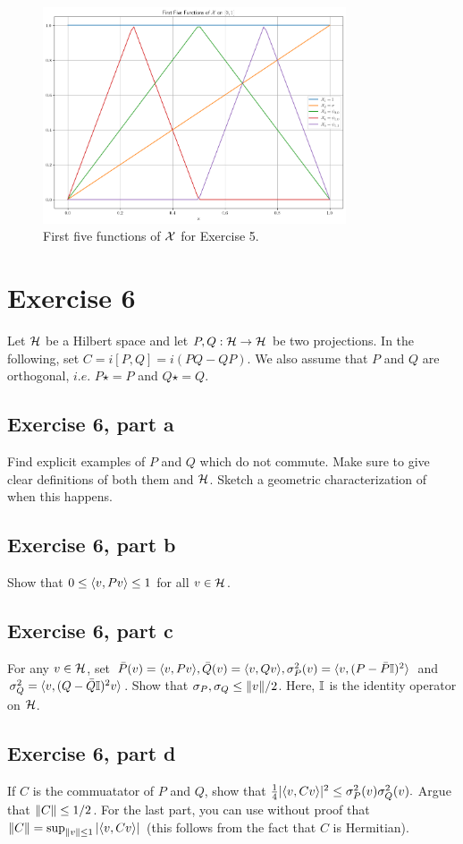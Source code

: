 \newpage
\vspace{5in}
\begin{figure}
    \centering
    \includegraphics[width = 0.8\textwidth]{Figures/Exercise5.png}
    \caption{First five functions of $\mathcal{X}$ for Exercise 5.}
    \label{fig:Exercise5}
\end{figure}
\clearpage

\newpage
\section{Exercise 6}
Let $\mathcal{H}$ be a Hilbert space and let $P, Q: \mathcal{H} \to \mathcal{H}$ be two projections. In the following, set $C = i[P, Q] = i(PQ - QP)$. We also assume that $P$ and $Q$ are orthogonal, $i.e.$ $P\star = P$ and $Q\star = Q$.
\subsection{Exercise 6, part a}
Find explicit examples of $P$ and $Q$ which do not commute. Make sure to give clear definitions of both them and $\mathcal{H}$. Sketch a geometric characterization of when this happens. 

\newpage
\subsection{Exercise 6, part b}
Show that $0 \leq \langle v, Pv \rangle \leq 1$ for all $v \in \mathcal{H}$. 

\newpage
\subsection{Exercise 6, part c}
For any $v \in \mathcal{H}$, set $\Bar{P}(v) = \langle v, Pv \rangle, \Bar{Q}(v) = \langle v, Qv \rangle, \sigma^2_P(v) = \langle v, (P - \Bar{P} \mathbb{I})^2 \rangle$ and $\sigma_Q^2 = \langle v, (Q - \Bar{Q} \mathbb{I})^2 v \rangle$. Show that $\sigma_P, \sigma_Q \leq \norm{v} / 2$. Here, $\mathbb{I}$ is the identity operator on $\mathcal{H}$.  

\newpage
\subsection{Exercise 6, part d}
If $C$ is the commuatator of $P$ and $Q$, show that $\frac{1}{4}|\langle v, Cv \rangle|^2 \leq \sigma_P^2(v) \sigma_Q^2(v).$ Argue that $\norm{C} \leq 1/2$. For the last part, you can use without proof that $\norm{C} = \sup_{\norm{v}\leq 1} |\langle v, Cv \rangle|$ (this follows from the fact that $C$ is Hermitian).
